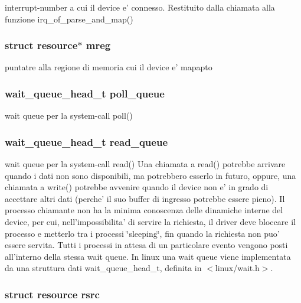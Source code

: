 interrupt-\/number a cui il device e' connesso. Restituito dalla chiamata alla funzione irq\+\_\+of\+\_\+parse\+\_\+and\+\_\+map() \hypertarget{structmy_g_p_i_o_k__t_a18c4eb95350c67ccb239a8a39c43c09a}{
\subsubsection[{mreg}]{\setlength{\rightskip}{0pt plus 5cm}struct resource$\ast$ mreg}}\label{structmy_g_p_i_o_k__t_a18c4eb95350c67ccb239a8a39c43c09a}
puntatre alla regione di memoria cui il device e' mapapto \hypertarget{structmy_g_p_i_o_k__t_a2080617f88cafd765430573afe7701d1}{
\subsubsection[{poll\+\_\+queue}]{\setlength{\rightskip}{0pt plus 5cm}wait\+\_\+queue\+\_\+head\+\_\+t poll\+\_\+queue}}\label{structmy_g_p_i_o_k__t_a2080617f88cafd765430573afe7701d1}
wait queue per la system-\/call poll() \hypertarget{structmy_g_p_i_o_k__t_a251570f8e6976ad87411093e330e7b4f}{
\subsubsection[{read\+\_\+queue}]{\setlength{\rightskip}{0pt plus 5cm}wait\+\_\+queue\+\_\+head\+\_\+t read\+\_\+queue}}\label{structmy_g_p_i_o_k__t_a251570f8e6976ad87411093e330e7b4f}
wait queue per la system-\/call read() Una chiamata a read() potrebbe arrivare quando i dati non sono disponibili, ma potrebbero esserlo in futuro, oppure, una chiamata a write() potrebbe avvenire quando il device non e' in grado di accettare altri dati (perche' il suo buffer di ingresso potrebbe essere pieno). Il processo chiamante non ha la minima conoscenza delle dinamiche interne del device, per cui, nell'impossibilita' di servire la richiesta, il driver deve bloccare il processo e metterlo tra i processi \char`\"{}sleeping\char`\"{}, fin quando la richiesta non puo' essere servita. Tutti i processi in attesa di un particolare evento vengono posti all'interno della stessa wait queue. In linux una wait queue viene implementata da una struttura dati wait\+\_\+queue\+\_\+head\+\_\+t, definita in $<$linux/wait.\+h$>$. \hypertarget{structmy_g_p_i_o_k__t_a565a1848c3ae8026257a74cf169c6941}{
\subsubsection[{rsrc}]{\setlength{\rightskip}{0pt plus 5cm}struct resource rsrc}}\label{structmy_g_p_i_o_k__t_a565a1848c3ae8026257a74cf169c6941}
